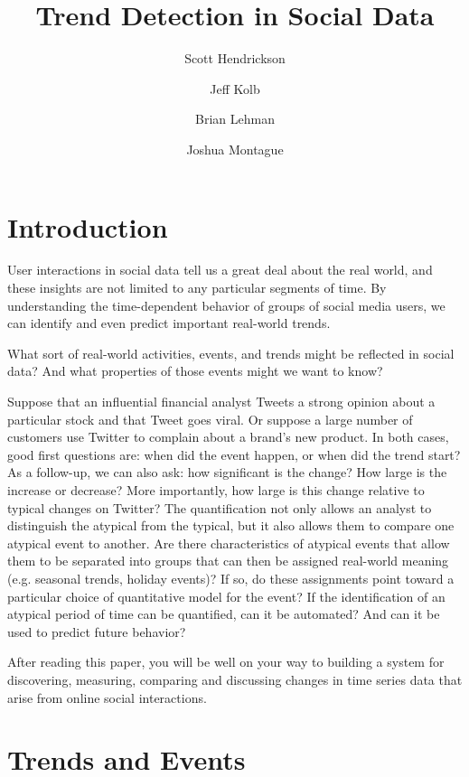 \documentclass{article}
\title{Trend Detection in Social Data}
\author[]{Scott Hendrickson}
\author[]{Jeff Kolb}
\author[]{Brian Lehman}
\author[]{Joshua Montague}
\affil[]{ \Large{Twitter, Inc.} }
\begin{document}


\frenchspacing

\section{Introduction}
\label{intro}

User interactions in social data tell us a great deal about the real world, and
these insights are not limited to any particular segments of time. By
understanding the time-dependent behavior of groups of social media users, we
can identify and even predict important real-world trends.

What sort of real-world activities, events, and trends might be reflected in
social data? And what properties of those events might we want to know?

Suppose that an influential financial analyst Tweets a strong opinion about a
particular stock and that Tweet goes viral. Or suppose a large number of
customers use Twitter to complain about a brand's new product. In both cases,
good first questions are: when did the event happen, or when did the trend
start? As a follow-up, we can also ask: how significant is the change?  How
large is the increase or decrease? More importantly, how large is this change
relative to typical changes on Twitter? The quantification not only allows an
analyst to distinguish the atypical from the typical, but it also allows them
to compare one atypical event to another. Are there characteristics of atypical
events that allow them to be separated into groups that can then be assigned
real-world meaning (e.g. seasonal trends, holiday events)? If so, do these
assignments point toward a particular choice of quantitative model for the
event? If the identification of an atypical period of time can be quantified,
can it be automated? And can it be used to predict future behavior?

After reading this paper, you will be well on your way to building a system for
discovering, measuring, comparing and discussing changes in time series data
that arise from online social interactions.

\section{Trends and Events}  \label{definitions}
\end{document}
